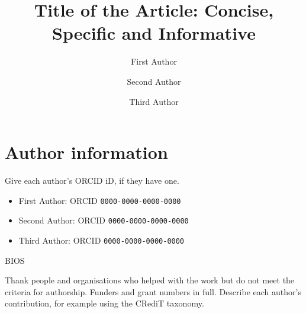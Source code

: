 \documentclass[journal,{{CITEOPT}}]{nextgeniq}
\title{Title of the Article: Concise, Specific and Informative}
\author[1]{First Author}
\author[2]{Second Author}
\author[1]{Third Author}
\affil[1]{Department, University, City, Country}
\affil[2]{Department, Institution, City, Country}
\begin{document}
\maketitle

\section*{Author information}
Give each author's ORCID iD, if they have one.
\begin{itemize}
  \item First Author: ORCID \texttt{0000-0000-0000-0000}
  \item Second Author: ORCID \texttt{0000-0000-0000-0000}
  \item Third Author: ORCID \texttt{0000-0000-0000-0000}
\end{itemize}

{{BIOS}}\begin{declarations}
   Thank people and organisations who helped
  with the work but do not meet the criteria for authorship.
   Funders and grant numbers in full.
   Describe each author's contribution,
  for example using the CRediT taxonomy.
\end{declarations}
\end{document}
